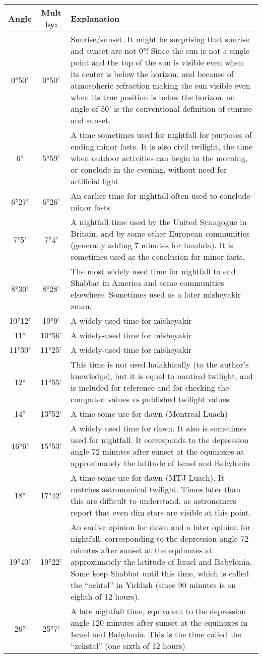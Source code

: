 \begin{tabular}{c | c | p{}}
	Angle&Mult by:&Explanation\\\hline
	0°50'&0°50'&Sunrise/sunset. It might be surprising that sunrise and sunset are not 0°! Since the sun is not a single point and the top of the sun is visible even when its center is below the horizon, and because of atmospheric refraction making the sun visible even when its true position is below the horizon, an angle of 50' is the conventional definition of sunrise and sunset.\\\hline
	6°&5°59'&A time sometimes used for nightfall for purposes of ending minor fasts.  It is also civil twilight, the time when outdoor activities can begin in the morning, or conclude in the evening, without need for artificial light\\\hline
	6°27'&6°26'
	&An earlier time for nightfall often used to conclude minor fasts.\\\hline
	7°5'&7°4'&A nightfall time used by the United Synagogue in Britain, and by some other European communities (generally adding 7 minutes for havdala). It is sometimes used as the conclusion for minor fasts.\\\hline
	8°30'&8°28'&The most widely used time for nightfall to end Shabbat in America and some communities elsewhere. Sometimes used as a later misheyakir zman.\\\hline
	10°12'&10°9'&A widely-used time for misheyakir\\\hline
	11°&10°56'&A widely-used time for misheyakir\\\hline
	11°30'&11°25'&A widely-used time for misheyakir\\\hline
	12°&11°55'&This time is not used halakhically (to the author's knowledge), but it is equal to nautical twilight, and is included for reference and for checking the computed values vs published twilight values\\\hline
	14°&13°52'&A time some use for dawn (Montreal Luach)\\\hline
	16°6'&15°53'&A widely used time for dawn. It also is sometimes used for nightfall. It corresponds to the depression angle 72 minutes after sunset at the equinoxes at approximately the latitude of Israel and Babylonia\\\hline
	18°&17°42'&A time some use for dawn (MTJ Luach). It matches astronomical twilight. Times later than this are difficult to understand, as astronomers report that even dim stars are visible at this point.\\\hline
	19°40'&19°22'&An earlier opinion for dawn and a later opinion for nightfall, corresponding to the depression angle 72 minutes after sunset at the equinoxes at approximately the latitude of Israel and Babylonia. Some keep Shabbat until this time, which is called the ``ochtal'' in Yiddish (since 90 minutes is an eighth of 12 hours).\\\hline
	26°&25°7'&A late nightfall time, equivalent to the depression angle 120 minutes after sunset at the equinoxes in Israel and Babylonia. This is the time called the ``zekstal'' (one sixth of 12 hours)\\\hline
\end{tabular}

